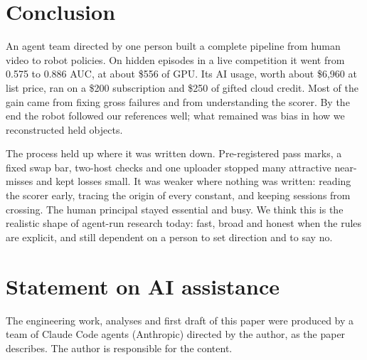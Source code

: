 \documentclass[11pt]{article}
\begin{document}
\section{Conclusion}
An agent team directed by one person built a complete pipeline from human video to robot policies. On hidden episodes in a live competition it went from 0.575 to 0.886 AUC, at about \$556 of GPU. Its AI usage, worth about \$6,960 at list price, ran on a \$200 subscription and \$250 of gifted cloud credit. Most of the gain came from fixing gross failures and from understanding the scorer. By the end the robot followed our references well; what remained was bias in how we reconstructed held objects.

The process held up where it was written down. Pre-registered pass marks, a fixed swap bar, two-host checks and one uploader stopped many attractive near-misses and kept losses small. It was weaker where nothing was written: reading the scorer early, tracing the origin of every constant, and keeping sessions from crossing. The human principal stayed essential and busy. We think this is the realistic shape of agent-run research today: fast, broad and honest when the rules are explicit, and still dependent on a person to set direction and to say no.

\section*{Statement on AI assistance}
The engineering work, analyses and first draft of this paper were produced by a team of Claude Code agents (Anthropic) directed by the author, as the paper describes. The author is responsible for the content.
\end{document}
